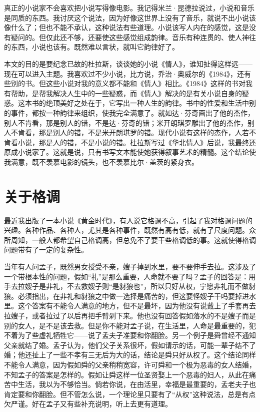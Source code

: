 真正的小说家不会喜欢把小说写得像电影。我记得米兰·昆德拉说过，小说和音乐是同质的东西。我讨厌这个说法，因为好像这世界上没有了音乐，就说不出小说该像什么了；但也不能不承认，这种说法有些道理。小说该写人内在的感觉，这是没有疑问的。但仅此还不够，还要使这些感觉组成韵律。音乐有种连贯的、使人神往的东西，小说也该有。既然难以言状，就叫它韵律好了。　 

本文的目的是要纪念已故的杜拉斯，谈谈她的小说《情人》，谁知扯得这样远——现在可以进入主题。我喜欢过不少小说，比方说，乔治·奥威尔的《1984》，还有些别的书。但这些小说对我的意义都不能和《情人》相比。《1984》这样的书对我有帮助，是帮我解决人生中的一些疑惑，而《情人》解决的是有关小说自身的疑惑。这本书的绝顶美好之处在于，它写出一种人生的韵律。书中的性爱和生活中别的事件，都按一种韵律来组织，使我完全满意了。就如达·芬奇画出了他的杰作，别人不肯看，那是别人的错，不是达·芬奇的错；米开朗琪罗雕出了他的杰作，别人不肯看，那是别人的错，不是米开朗琪罗的错。现代小说有这样的杰作，人若不肯看小说，那是人的错，不是小说的错。杜拉斯写过《华北情人》后说，我最终还原成小说家了。这就是说，只有书写文本能使她获得叙事艺术的精髓。这个结论使我满意，既不羡慕电影的镜头，也不羡慕比尔·盖茨的紧身衣。　

\chapter{关于格调}

最近我出版了一本小说《黄金时代》，有人说它格调不高，引起了我对格调问题的兴趣。各种作品、各种人，尤其是各种事件，既然有高有低，就有了尺度问题。众所周知，一般人都希望自己格调高，但总免不了要干些格调低的事。这就使得格调问题带有了一定的复杂性。　 

当年有人问孟子，既然男女授受不亲，嫂子掉到水里，要不要伸手去拉。这涉及了一个带根本性的问题，假如“礼”是那么重要，人命就不要了吗？孟子的回答是：用手去拉嫂子是非礼，不去救嫂子则“是豺狼也”，所以只好从权，宁愿非礼而不做豺狼。必须指出，在非礼和豺狼之中做一选择是痛苦的，但这要怪嫂子干吗要掉进水里。这个答案有不能令人满意的地方，但不是最坏，因为他没有说戴上了手套再去拉嫂子，或者拉过了以后再把手臂剁下来。他也没有回答假如落水的不是嫂子而是别的女人，是不是该去救。但是你不能对孟子说，在生活里，人命是最重要的，犯不着为了些虚礼牺牲它——说了孟夫子准要和你翻脸。另一个例子是舜曾经不通知父亲就结了婚。孟子认为，他们父子关系很坏，假如请示的话，可能一辈子结不了婚；他还扯上了一些不孝有三无后为大的话，结论是舜只好从权了。这个结论同样不能令人满意，因为假如舜的父亲稍稍宽容，许可舜和一个极为恶毒的女人结婚，不知孟子的答案是怎样的。假如让舜这样一位圣贤娶上一个恶毒的妇人，从此在痛苦中生活，我以为不够恰当。倘若你说，在由活里，幸福是最重要的，孟老夫子也肯定要和你翻脸。但不管怎么说，一个理论里只要有了“从权”这种说法，总是有点欠严谨。好在孟子又有些补充说明，听上去更有道理。　 

